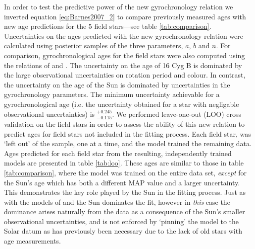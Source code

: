 \documentclass[10pt,preprint]{aastex}
\begin{document}
In order to test the predictive power of the new gyrochronology relation we inverted equation \ref{eq:Barnes2007_2}
to compare previously measured ages with new age predictions for the 5 field stars---see table \ref{tab:comparison}.
Uncertainties on the ages predicted with the new gyrochronology relation were calculated using posterior samples of the three parameters, $a$, $b$ and $n$.
For comparison, gyrochronological ages for the field stars were also computed using the relations of \citet{Barnes2007} and \citet{Mamajek2008}.
The uncertainty on the age of 16 Cyg B is dominated by the large observational uncertainties on rotation period and colour.
In contrast, the uncertainty on the age of the Sun is dominated by uncertainties in the gyrochronology parameters.
The minimum uncertainty achievable for a gyrochronological age (i.e. the uncertainty obtained for a star with negligable observational uncertainties) is $^{+0.245}_{-0.115}$.
We performed leave-one-out (LOO) cross validation on the field stars in order to assess the ability of this new relation to predict ages for field stars not included in the fitting process.
Each field star, was `left out' of the sample, one at a time, and the model trained the remaining data.
Ages predicted for each field star from the resulting, independently trained models are presented in table \ref{tab:loo}.
These ages are similar to those in table \ref{tab:comparison}, where the model was trained on the entire data set, {\it except} for the Sun's age which has both a different MAP value and a larger uncertainty.
This demonstrates the key role played by the Sun in the fitting process.
Just as with the models of \citet{Barnes2007} and \citet{Mamajek2008} the Sun dominates the fit, however in {\it this} case the dominance arises naturally from the data as a consequence of the Sun's smaller observational uncertainties, and is not enforced by `pinning' the model to the Solar datum as has previously been necessary due to the lack of old stars with age measurements.
\end{document}
